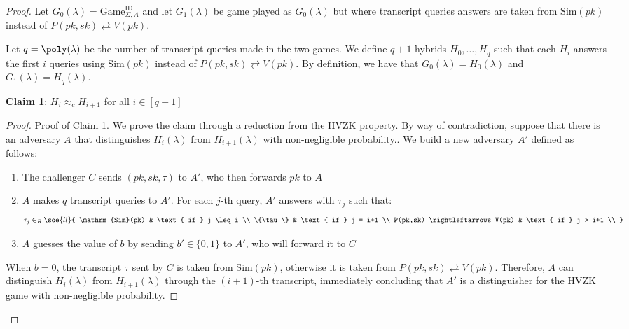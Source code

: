 \documentclass[a4paper, 12pt]{report}
\begin{document}
    \begin{proof}
        Let $G_0(\lambda) = \mathrm{Game}^{\text{ID}}_{\Sigma, A}$ and let $G_1(\lambda)$ be game played as $G_0(\lambda)$ but where transcript queries answers are taken from $\mathrm{Sim}(pk)$ instead of $P(pk,sk) \rightleftarrows V(pk)$.

        Let $q = \poly(\lambda)$ be the number of transcript queries made in the two games. We define $q+1$ hybrids $H_0, \ldots, H_q$ such that each $H_i$ answers  the first $i$ queries using $\mathrm{Sim}(pk)$ instead of $P(pk,sk) \rightleftarrows V(pk)$. By definition, we have that $G_0(\lambda) = H_0(\lambda)$ and $G_1(\lambda) = H_q(\lambda)$.

        \textbf{Claim 1}: $H_i \approx_c H_{i+1}$ for all $i \in [q-1]$

        \begin{proof}{Proof of Claim 1.}
            We prove the claim through a reduction from the HVZK property. By way of contradiction, suppose that there is an adversary $A$ that distinguishes $H_i(\lambda)$ from $H_{i+1}(\lambda)$ with non-negligible probability.. We build a new adversary $A'$ defined as follows:
            \begin{enumerate}
                \item The challenger $C$ sends $(pk, sk, \tau)$ to $A'$, who then forwards $pk$ to $A$
                \item $A$ makes $q$ transcript queries to $A'$. For each $j$-th query, $A'$ answers with $\tau_j$ such that:
                \[\tau_j \in_R \soe{ll}{
                    \mathrm{Sim}(pk) & \text{ if } j \leq i \\
                    \{\tau\} & \text{ if } j = i+1 \\
                    P(pk,sk) \rightleftarrows V(pk) & \text{ if } j > i+1 \\
                }\]
                \item $A$ guesses the value of $b$ by sending $b' \in \{0,1\}$ to $A'$, who will forward it to $C$ 
            \end{enumerate}

            When $b = 0$, the transcript $\tau$ sent by $C$ is taken from $\mathrm{Sim}(pk)$, otherwise it is taken from $P(pk,sk) \rightleftarrows V(pk)$. Therefore, $A$ can distinguish $H_i(\lambda)$ from $H_{i+1}(\lambda)$ through the $(i+1)$-th transcript, immediately concluding that $A'$ is a distinguisher for the HVZK game with non-negligible probability.
        \end{proof}


\end{proof}
\end{document}
